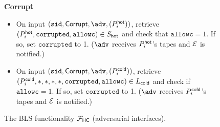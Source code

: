 \begin{figure*}
{{    \textbf{Corrupt}
    \begin{itemize}
        \item On input $(\sid,\mathsf{Corrupt}, \adv, (P_i^\hot))$, retrieve $(P_i^{\mathsf{hot}}, \texttt{corrupted}, \texttt{allowc}) \in S_{\mathsf{hot}}$ and check that $\texttt{allowc}=1$. If so, set $\texttt{corrupted}$ to 1. ($\adv$ receives $P_i^{\mathsf{hot}}$'s tapes and $\mathcal{E}$ is notified.)
        \item On input $(\sid,\mathsf{Corrupt}, \adv, (P_i^\cold))$, retrieve $(P_i^{\mathsf{cold}}, *, *, *, *, \texttt{corrupted},\allowbreak \texttt{allowc}) \in L_{\mathsf{cold}}$ and check if $\texttt{allowc}=1$. If so, set $\texttt{corrupted}$ to 1. ($\adv$ receives $P_i^{\mathsf{cold}}$'s tapes and $\mathcal{E}$ is notified.)
    \end{itemize}
    }}
        \caption{The BLS \hcwl functionality $\mathcal{F}_\mathsf{HC}$ (adversarial interfaces).}
        \label{fig:FSign4}
    \end{figure*}